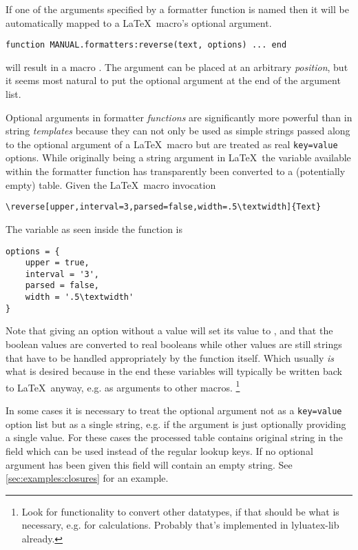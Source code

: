 \documentclass[12pt]{scrartcl}
\begin{document}
If one of the arguments specified by a formatter function is named  then it will be automatically mapped to a \LaTeX\ macro's optional argument.

\begin{verbatim}
function MANUAL.formatters:reverse(text, options) ... end
\end{verbatim}

\noindent will result in a macro \texttt{}. The
 argument can be placed at an arbitrary \emph{position}, but it
seems most natural to put the optional argument at the end of the argument list.

Optional arguments in formatter \emph{functions} are significantly more powerful
than in string \emph{templates} because they can not only be used as simple
strings passed along to the optional argument of a \LaTeX\ macro but are treated
as real \texttt{key=value} options.  While originally being a string argument in \LaTeX\ the  variable available within the formatter function has transparently been converted to a (potentially empty) table.
Given the \LaTeX\ macro invocation

\begin{verbatim}
\reverse[upper,interval=3,parsed=false,width=.5\textwidth]{Text}
\end{verbatim}

The  variable as seen inside the function is

\begin{verbatim}
options = {
	upper = true,
	interval = '3',
	parsed = false,
	width = '.5\textwidth'
}
\end{verbatim}

\noindent Note that giving an option without a value will set its value to
, and that the boolean values are converted to real booleans while
other values are still strings that have to be handled appropriately by the
function itself. Which usually \emph{is} what is desired because in the end
these variables will typically be written back to \LaTeX\ anyway, e.g. as
arguments to other macros.%
\footnote{ Look for functionality to convert other datatypes, if
that should be what is necessary, e.g. for calculations. Probably that's
implemented in lyluatex-lib already.}

In some cases it is necessary to treat the optional argument not as a
\texttt{key=value} option list but as a single string, e.g. if the argument is
just optionally providing a single value.  For these cases the processed
 table contains original string in the field 
which can be used instead of the regular lookup keys.  If no optional argument
has been given this field will contain an empty string.  See
\vref{sec:examples:closures} for an example.
\end{document}
